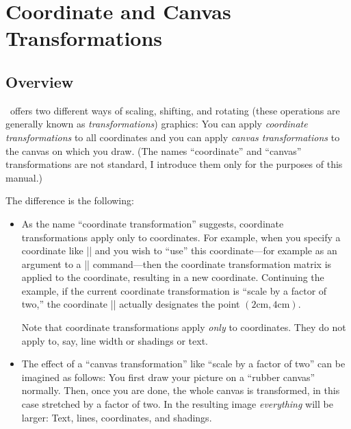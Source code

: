 %
%
%

\section{Coordinate and Canvas Transformations}

\subsection{Overview}

\pgfname\ offers two different ways of scaling, shifting, and rotating
(these operations are generally known as \emph{transformations})
graphics: You can apply \emph{coordinate transformations} to all
coordinates and you can apply \emph{canvas transformations} to the
canvas on which you draw. (The names ``coordinate'' and ``canvas''
transformations are not standard, I introduce them only for the
purposes of this manual.) 

The difference is the following:

\begin{itemize}
\item
  As the name ``coordinate transformation'' suggests, coordinate
  transformations apply only to coordinates. For example, when you
  specify a coordinate like |\pgfpoint{1cm}{2cm}| and you wish to
  ``use'' this coordinate---for example as an argument to a
  |\pgfpathmoveto| command---then the coordinate transformation matrix
  is applied to the coordinate, resulting in a new
  coordinate. Continuing the example, if the current coordinate
  transformation is ``scale by a factor of two,'' the coordinate
  |\pgfpoint{1cm}{2cm}| actually designates the point
  $(2\mathrm{cm},4\mathrm{cm})$. 

  Note that coordinate transformations apply \emph{only} to
  coordinates. They do not apply to, say, line width or shadings or
  text.
\item
  The effect of a ``canvas transformation'' like ``scale by a factor
  of two'' can be imagined as follows: You first draw your picture on
  a ``rubber canvas'' normally. Then, once you are done, the whole
  canvas is transformed, in this case stretched by a factor of
  two. In the resulting image \emph{everything} will be larger: Text,
  lines, coordinates, and shadings.
\end{itemize}

